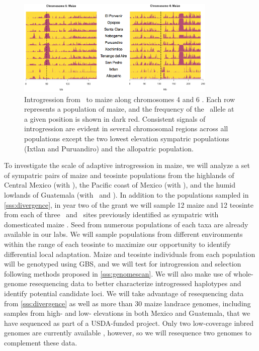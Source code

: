 \begin{figure}[t]
  \centering
   \includegraphics[width=0.85\textwidth]{same_regions}
    \caption{ Introgression from \zm\ to maize along chromosomes 4 and 6 \citep{Hufford2013}. Each row represents a population of maize, and the frequency of the \zm\ allele at a given position is shown in dark red. Consistent signals of introgression are evident in several chromosomal regions across all populations except the two lowest elevation sympatric populations (Ixtlan and Puruandiro) and the allopatric population.}
\label{fig:sameregions}
\end{figure} 

To investigate the scale of adaptive introgression in maize, we will analyze a set of sympatric pairs of maize and teosinte populations from the highlands of Central Mexico (with \zm), the Pacific coast of Mexico (with \zp), and the humid lowlands of Guatemala (with \zl\ and \zh). 
In addition to the populations sampled in \ref{sss:divergence}, in year two of the grant we will sample 12 maize and 12 teosinte from each of three \zm\ and \zp\ sites previously identified as sympatric with domesticated maize \citep{hufford2010genetic, Hufford2013}.  
Seed from numerous populations of each taxa are already available in our labs.
We will sample populations from different environments within the range of each teosinte to maximize our opportunity to identify differential local adaptation.
Maize and teosinte individuals from each population will be genotyped using GBS, and we will test for introgression and selection following methods proposed in \ref{sss:genomescan}.
We will also make use of whole-genome resequencing data to better characterize introgressed haplotypes and identify potential candidate loci. 
We will take advantage of resequencing data from \ref{sss:divergence} as well as more than 30 maize landrace genomes, including samples from high- and low- elevations in both Mexico and Guatemala, that we have sequenced as part of a USDA-funded project.  
Only two low-coverage inbred \zm{} genomes are currently available \citep{Chia2012a}, however, so we will resequence two \zm{} genomes to complement these data.

